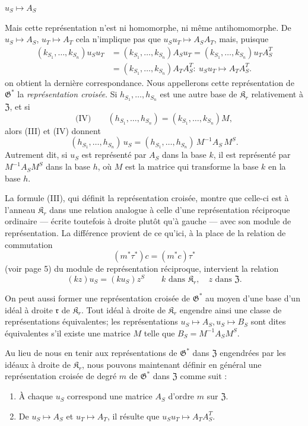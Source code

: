 \(u_S \mapsto A_S\)

Mais cette représentation n'est ni homomorphe, ni même antihomomorphe. De
\(u_S \mapsto A_S\), \(u_T \mapsto A_T\)
cela n'implique pas que \(u_Su_T \mapsto A_SA_T\), mais, puisque
\[
\begin{aligned}
(k_{S_1}, \ldots, k_{S_n})u_Su_T
&=(k_{S_1}, \ldots, k_{S_n})A_Su_T
=(k_{S_1}, \ldots, k_{S_n})u_TA_S^T\\
&=(k_{S_1}, \ldots, k_{S_n})A_TA_S^T:\ u_Su_T\mapsto A_TA_S^T.
\end{aligned}
\]
on obtient la dernière correspondance. Nous appellerons cette représentation de \(\mathfrak G^*\) la \emph{représentation croisée}. Si \(h_{S_1}, \ldots, h_{S_n}\) est une autre base de \(\mathfrak K_r\) relativement à \(\mathfrak Z\), et si
\[
\text{(IV)}\qquad (h_{S_1}, \ldots, h_{S_n}) = (k_{S_1}, \ldots, k_{S_n})M,
\]
alors (III) et (IV) donnent
\[
(h_{S_1},\ldots,h_{S_n})\,u_S=(h_{S_1},\ldots,h_{S_n})\,M^{-1}A_S\,M^S.
\]
Autrement dit, si \(u_S\) est représenté par \(A_S\) dans la base \(k\), il est représenté par \(M^{-1}A_SM^S\) dans la base \(h\), où \(M\) est la matrice qui transforme la base \(k\) en la base \(h\).

La formule (III), qui définit la représentation croisée, montre que celle-ci est à l'anneau \(\mathfrak K_r\) dans une relation analogue à celle d'une représentation réciproque ordinaire --- écrite toutefois à droite plutôt qu'à gauche --- avec son module de représentation. La différence provient de ce qu'ici, à la place de la relation de commutation
\[
(m^*\tau^*)c = (m^*c)\tau^*
\]
(voir page 5) du module de représentation réciproque, intervient la relation
\[
(kz)u_S=(ku_S)z^S\qquad k\text{ dans }\mathfrak K_r,\quad z\text{ dans }\mathfrak Z.
\]

On peut aussi former une représentation croisée de \(\mathfrak G^*\) au moyen d'une base d'un idéal à droite \(\mathfrak r\) de \(\mathfrak K_r\). Tout idéal à droite de \(\mathfrak K_r\) engendre ainsi une classe de représentations équivalentes; les représentations \(u_S \mapsto A_S, u_S \mapsto B_S\) sont dites équivalentes s'il existe une matrice \(M\) telle que \(B_S = M^{-1}A_SM^S\).

Au lieu de nous en tenir aux représentations de \(\mathfrak G^*\) dans \(\mathfrak Z\) engendrées par les idéaux à droite de \(\mathfrak K_r\), nous pouvons maintenant définir en général une représentation croisée de degré \(m\) de \(\mathfrak G^*\) dans \(\mathfrak Z\) comme suit :

\begin{enumerate}
\item À chaque \(u_S\) correspond une matrice \(A_S\) d'ordre \(m\) sur \(\mathfrak Z\).
\item De \(u_S \mapsto A_S\) et \(u_T \mapsto A_T\), il résulte que \(u_Su_T \mapsto A_TA_S^T\).
\end{enumerate}

